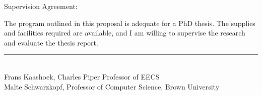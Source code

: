 \vspace{1em}
\noindent Supervision Agreement:

\vspace{1em}
\begin{minipage}{\dimexpr\textwidth-1cm}
\noindent The program outlined in this proposal is adequate for a PhD thesis. The
supplies and facilities required are available, and I am willing to supervise
the research and evaluate the thesis report.
\end{minipage}

\vspace{2em}
\begin{flushright}
    \rule{0.7\linewidth}{0.1pt}\\
    {\normalsize Frans Kaashoek, Charles Piper Professor of EECS}\\
    {\normalsize Malte Schwarzkopf, Professor of Computer Science, Brown University}
\end{flushright}

\restoregeometry

\endgroup

\begin{comment}
\title{Helping Web Developers Give Users Control Over Their Data (Proposal)}
\author{Lillian Tsai}
\prevdegrees{
  A.B., Harvard University (2017) \\
  S.M., Harvard University (2017)}
\department{Department of Electrical Engineering and Computer Science}
\degree{Doctor of Philosophy}
\degreemonth{May}
\degreeyear{2024}
\thesisdate{May 13, 2024}
\supervisor{M. Frans Kaashoek}{Charles Piper Professor of Electrical Engineering and Computer Science}
\cosupervisor{Malte Schwarzkopf}{Professor of Computer Science, Brown University}
\chairman{Leslie A. Kolodziejski}{Professor of Electrical Engineering and
  Computer Science \\ Chair, Department Committee
  on Graduate Students}
\end{comment}
